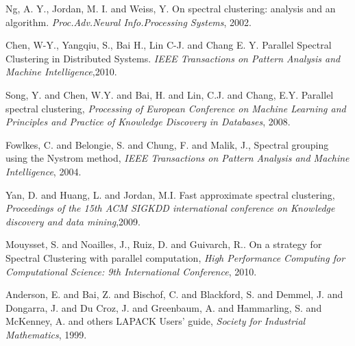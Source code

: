 \documentclass{llncs}
\begin{document}
\begin{thebibliography}{5}
%
Ng, A. Y., Jordan, M. I.  and Weiss, Y.
On spectral clustering: analysis and an algorithm.
\emph{Proc.Adv.Neural Info.Processing Systems}, 2002.


Chen, W-Y., Yangqiu, S., Bai H., Lin C-J. and Chang E. Y.
Parallel Spectral Clustering in Distributed Systems.
\emph{IEEE Transactions on Pattern Analysis and Machine Intelligence},2010.


%



Song, Y. and Chen, W.Y. and Bai, H. and Lin, C.J. and Chang, E.Y.
Parallel spectral clustering,
\emph{Processing of European Conference on Machine Learning and Principles and Practice of Knowledge Discovery in Databases}, 2008.

  Fowlkes, C. and Belongie, S. and Chung, F. and Malik, J.,
  Spectral grouping using the Nystrom method,
\emph{IEEE Transactions on Pattern Analysis and Machine Intelligence}, 2004.

Yan, D. and Huang, L. and Jordan, M.I.
Fast approximate spectral clustering,
\emph{Proceedings of the 15th ACM SIGKDD international conference on Knowledge discovery and data mining},2009.



Mouysset, S. and Noailles, J., Ruiz, D. and Guivarch, R..
On a strategy for Spectral Clustering with parallel computation,
\emph{High Performance Computing for Computational Science: 9th International Conference}, 2010.


Anderson, E. and Bai, Z. and Bischof, C. and Blackford, S. and Demmel, J. and Dongarra, J. and Du Croz, J. and Greenbaum, A. and Hammarling, S. and McKenney, A. and others
LAPACK Users' guide,
 \emph{Society for Industrial Mathematics}, 1999.



\end{thebibliography}
\end{document}
